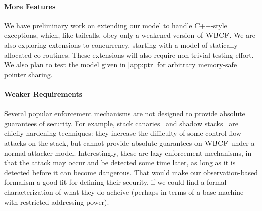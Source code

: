 \documentclass[10pt,conference]{ieeetran}%
\theoremstyle{definition}
\begin{document}
\paragraph*{More Features}

We have preliminary work on extending our model to handle C++-style
exceptions, which, like tailcalls, obey only a weakened version of \(\textnormal{\sc WBCF}\).
We are also exploring extensions to concurrency, starting with a model of
statically allocated co-routines.  These extensions will also require non-trivial
testing effort.  We also plan to test
the model given in \cref{app:ptr} for arbitrary memory-safe pointer sharing.

\paragraph*{Weaker Requirements}

Several popular enforcement mechanisms are not designed to provide
absolute guarantees of security. For example, stack canaries~\cite{Cowan+98}
and shadow stacks~\cite{Dang+15,Shanbhogue+19}
are chiefly hardening techniques: they increase the difficulty
of some control-flow attacks on the stack, but cannot provide absolute
guarantees on \(\textnormal{\sc WBCF}\) under a normal attacker model.
%
Interestingly, these are lazy enforcement mechanisms, in that
the attack may occur and be detected some time later, as long as
it is detected before it can become dangerous. That would make our
observation-based formalism a good fit for defining their security,
if we could find a formal characterization of what they do acheive
(perhaps in terms of a base machine with restricted addressing power).

\end{document}
